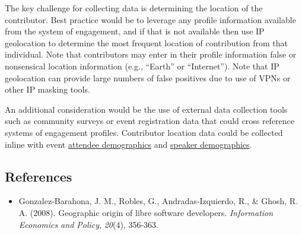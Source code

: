 The key challenge for collecting data is determining the location of the
contributor. Best practice would be to leverage any profile information
available from the system of engagement, and if that is not available
then use IP geolocation to determine the most frequent location of
contribution from that individual. Note that contributors may enter in
their profile information false or nonsensical location information
(e.g., ``Earth'' or ``Internet''). Note that IP geolocation can provide
large numbers of false positives due to use of VPNs or other IP masking
tools.

An additional consideration would be the use of external data collection
tools such as community surveys or event registration data that could
cross reference systems of engagement profiles. Contributor location
data could be collected inline with event
\href{https://chaoss.community/metric-attendee-demographics/}{attendee
demographics} and
\href{https://chaoss.community/metric-speaker-demographics/}{speaker
demographics}.

\hypertarget{references}{%
\subsection{References}\label{references}}

\begin{itemize}
\tightlist
\item
  Gonzalez-Barahona, J. M., Robles, G., Andradas-Izquierdo, R., \&
  Ghosh, R. A. (2008). Geographic origin of libre software developers.
  \emph{Information Economics and Policy}, \emph{20}(4), 356-363.
\end{itemize}
